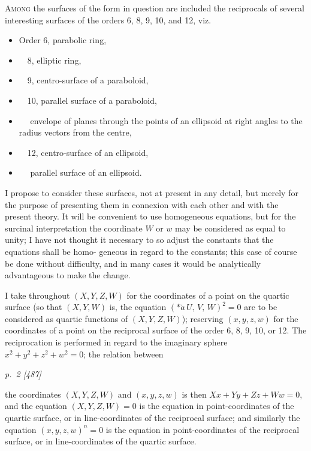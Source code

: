 \documentclass[11pt,a4paper]{article}
\theoremstyle{plain}
\theoremstyle{definition}
\begin{document}
\textsc{Among} the surfaces of the form in question are included the reciprocals
of several interesting surfaces of the orders 6, 8, 9, 10, and 12, viz.\
\begin{itemize}[leftmargin=2em]
\item[] Order 6, parabolic ring,
\item[] \ \ 8, elliptic ring,
\item[] \ \ 9, centro-surface of a paraboloid,
\item[] \ \ 10, parallel surface of a paraboloid,
\item[] \ \ \phantom{10,} envelope of planes through the points of an ellipsoid at right angles
       to the radius vectors from the centre,
\item[] \ \ 12, centro-surface of an ellipsoid,
\item[] \ \ \phantom{12,} parallel surface of an ellipsoid.
\end{itemize}

I propose to consider these surfaces, not at present in any detail, but merely for
the purpose of presenting them in connexion with each other and with the present
theory.  It will be convenient to use homogeneous equations, but for the surcinal
interpretation the coordinate $W$ or $w$ may be considered as equal to unity; I have
not thought it necessary to so adjust the constants that the equations shall be homo-
geneous in regard to the constants; this case of course be done without difficulty, and
in many cases it would be analytically advantageous to make the change.

I take throughout $(X, Y, Z, W)$ for the coordinates of a point on the quartic
surface (so that $(X, Y, W)$ is, the equation $(*\!\check{a}\,U,\,V,\,W)^2=0$ are to be considered as
quartic functions of $(X, Y, Z, W)$); reserving $(x, y, z, w)$ for the coordinates of a
point on the reciprocal surface of the order 6, 8, 9, 10, or 12.  The reciprocation is
performed in regard to the imaginary sphere $x^2 + y^2 + z^2 + w^2 = 0$; the relation between

\bigskip
\textit{p.~2 [487]}
\smallskip

\noindent
the coordinates $(X, Y, Z, W)$ and $(x, y, z, w)$ is then $X x + Y y + Z z + W w = 0$,
and the equation $(X, Y, Z, W) = 0$ is the equation in point-coordinates of the quartic surface,
or in line-coordinates of the reciprocal surface; and similarly the equation $(x, y, z, w)^n = 0$
is the equation in point-coordinates of the reciprocal surface, or in line-coordinates of
the quartic surface.
\end{document}
